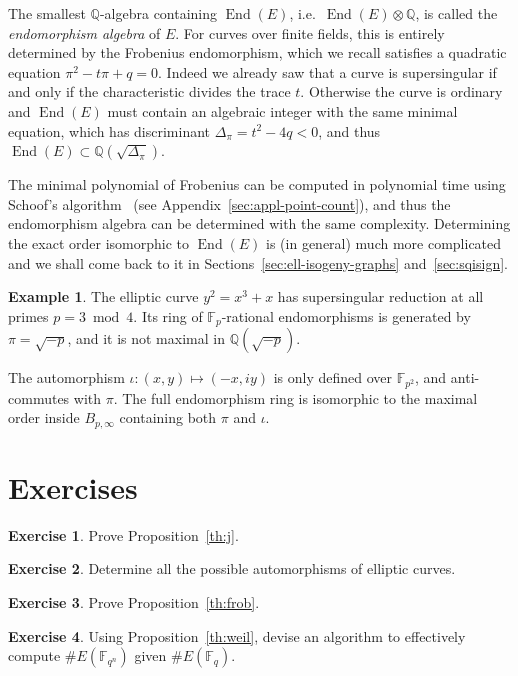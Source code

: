 \documentclass[10pt]{article}
\theoremstyle{plain}
\theoremstyle{definition}
\newtheorem{example}[theorem]{Example}
\newtheorem{exercise}{Exercise}[part]
\DeclareMathOperator{\End}{End} %
\def\F{\ensuremath{\mathbb{F}}}
\begin{document}
The smallest $ℚ$-algebra containing $\End(E)$, i.e.\ $\End(E)⊗ℚ$, is
called the \emph{endomorphism algebra} of $E$. %
For curves over finite fields, this is entirely determined by the
Frobenius endomorphism, which we recall satisfies a quadratic equation
$π^2 - tπ + q = 0$. %
Indeed we already saw that a curve is supersingular if and only if the
characteristic divides the trace $t$. %
Otherwise the curve is ordinary and $\End(E)$ must contain an
algebraic integer with the same minimal equation, which has
discriminant $Δ_π=t^2-4q<0$, and thus $\End(E)⊂ℚ(\sqrt{Δ_π})$.

The minimal polynomial of Frobenius can be computed in polynomial time
using Schoof's algorithm~\cite{schoof85} (see
Appendix~\ref{sec:appl-point-count}), and thus the endomorphism
algebra can be determined with the same complexity.
Determining the exact order isomorphic to $\End(E)$ is (in general)
much more complicated and we shall come back to it in
Sections~\ref{sec:ell-isogeny-graphs} and~\ref{sec:sqisign}.

\begin{example}
  \label{ex:1728}
  The elliptic curve $y^2=x^3+x$ has supersingular reduction at all
  primes $p=3\bmod 4$. %
  Its ring of $\F_p$-rational endomorphisms is generated by
  $π=\sqrt{-p}$, and it is not maximal in $ℚ(\sqrt{-p})$.

  The automorphism $ι:(x,y)↦(-x,iy)$ is only defined over $\F_{p^2}$,
  and anti-commutes with $π$. %
  The full endomorphism ring is isomorphic to the maximal order inside
  $B_{p,∞}$ containing both $π$ and $ι$.
\end{example}

\section*{Exercises}

\begin{exercise}
  Prove Proposition~\ref{th:j}.
\end{exercise}

\begin{exercise}
  Determine all the possible automorphisms of elliptic curves.
\end{exercise}

\begin{exercise}
  Prove Proposition~\ref{th:frob}.
\end{exercise}

\begin{exercise}
  Using Proposition~\ref{th:weil}, devise an algorithm to effectively
  compute $\#E(\F_{q^n})$ given $\#E(\F_q)$.
\end{exercise}
\end{document}
